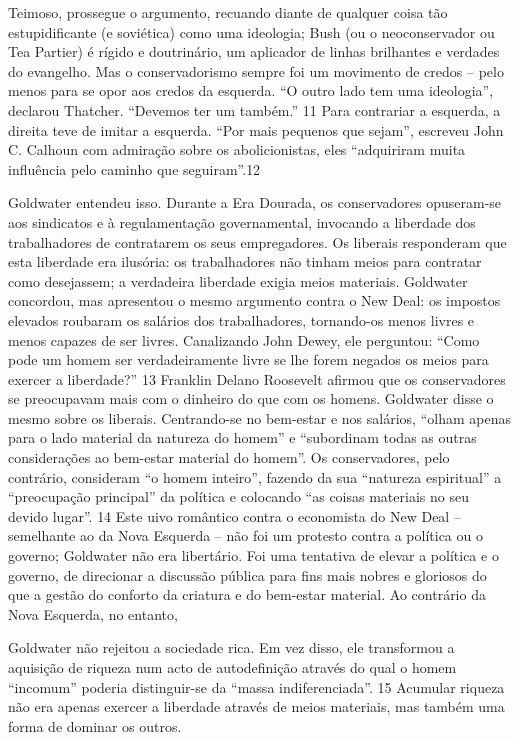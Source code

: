  \par 
Teimoso, prossegue o argumento, recuando diante de qualquer coisa tão estupidificante (e soviética) como uma ideologia; Bush (ou o neoconservador ou Tea Partier) é rígido e doutrinário, um aplicador de linhas brilhantes e verdades do evangelho. Mas o conservadorismo sempre foi um movimento de credos – pelo menos para se opor aos credos da esquerda. “O outro lado tem uma ideologia”, declarou Thatcher. “Devemos ter um também.” {\color{blue}11} Para contrariar a esquerda, a direita teve de imitar a esquerda. “Por mais pequenos que sejam”, escreveu John C. Calhoun com admiração sobre os abolicionistas, eles “adquiriram muita influência pelo caminho que seguiram”.{\color{blue}12}
 \par 
Goldwater entendeu isso. Durante a Era Dourada, os conservadores opuseram-se aos sindicatos e à regulamentação governamental, invocando a liberdade dos trabalhadores de contratarem os seus empregadores. Os liberais responderam que esta liberdade era ilusória: os trabalhadores não tinham meios para contratar como desejassem; a verdadeira liberdade exigia meios materiais. Goldwater concordou, mas apresentou o mesmo argumento contra o New Deal: os impostos elevados roubaram os salários dos trabalhadores, tornando-os menos livres e menos capazes de ser livres. Canalizando John Dewey, ele perguntou: “Como pode um homem ser verdadeiramente livre se lhe forem negados os meios para exercer a liberdade?” {\color{blue}13} Franklin Delano Roosevelt afirmou que os conservadores se preocupavam mais com o dinheiro do que com os homens. Goldwater disse o mesmo sobre os liberais. Centrando-se no bem-estar e nos salários, “olham apenas para o lado material da natureza do homem” e “subordinam todas as outras considerações ao bem-estar material do homem”. Os conservadores, pelo contrário, consideram “o homem inteiro”, fazendo da sua “natureza espiritual” a “preocupação principal” da política e colocando “as coisas materiais no seu devido lugar”. {\color{blue}14} Este uivo romântico contra o economista do New Deal – semelhante ao da Nova Esquerda – não foi um protesto contra a política ou o governo; Goldwater não era libertário. Foi uma tentativa de elevar a política e o governo, de direcionar a discussão pública para fins mais nobres e gloriosos do que a gestão do conforto da criatura e do bem-estar material. Ao contrário da Nova Esquerda, no entanto,
 \par 
Goldwater não rejeitou a sociedade rica. Em vez disso, ele transformou a aquisição de riqueza num acto de autodefinição através do qual o homem “incomum” poderia distinguir-se da “massa indiferenciada”. {\color{blue}15} Acumular riqueza não era apenas exercer a liberdade através de meios materiais, mas também uma forma de dominar os outros.
